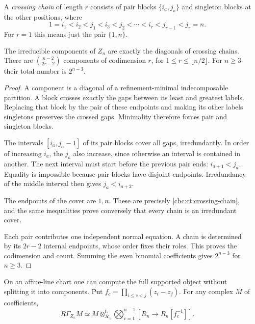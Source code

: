 A \emph{crossing chain} of length $r$ consists of pair blocks
$\{i_a,j_a\}$ and singleton blocks at the other positions,
where
\begin{equation}\label{cbc:ct:crossing-chain}
 1=i_1<i_2<j_1<i_3<j_2<\cdots<i_r<j_{r-1}<j_r=n.
\end{equation}
For $r=1$ this means just the pair $\{1,n\}$.

\begin{proposition}\label{cbc:ct:components}
The irreducible components of $Z_n$ are exactly the diagonals
of crossing chains. There are $\binom{n-2}{2r-2}$ components
of codimension $r$, for $1\leq r\leq\lfloor n/2\rfloor$.
For $n\geq3$ their total number is $2^{n-3}$.
\end{proposition}

\begin{proof}
A component is a diagonal of a refinement-minimal
indecomposable partition. A block crosses exactly the gaps
between its least and greatest labels. Replacing that block by
the pair of these endpoints and making its other labels
singletons preserves the crossed gaps. Minimality therefore
forces pair and singleton blocks.

The intervals $[i_a,j_a-1]$ of its pair blocks cover all gaps,
irredundantly. In order of increasing $i_a$, the $j_a$ also
increase, since otherwise an interval is contained in another.
The next interval must start before the previous pair ends:
$i_{a+1}<j_a$. Equality is impossible because pair blocks have
disjoint endpoints. Irredundancy of the middle interval then
gives $j_a<i_{a+2}$.

The endpoints of the cover are $1,n$.
These are precisely \eqref{cbc:ct:crossing-chain}, and the
same inequalities prove conversely that every chain is an
irredundant cover.

Each pair contributes one independent normal equation. A chain
is determined by its $2r-2$ internal endpoints, whose order
fixes their roles. This proves the codimension and count.
Summing the even binomial coefficients gives $2^{n-3}$ for
$n\geq3$.
\end{proof}

On an affine-line chart one can compute the full supported
object without splitting it into components. Put
$f_c=\prod_{i\leq c<j}(z_i-z_j)$. For any complex $M$ of
coefficients,
\begin{equation}\label{cbc:ct:cut-cech}
 R\Gamma_{Z_n}M\simeq
 M\otimes_{R_n}^{\mathrm L}
       \bigotimes_{c=1}^{n-1}[R_n\longrightarrow R_n[f_c^{-1}]].
\end{equation}


